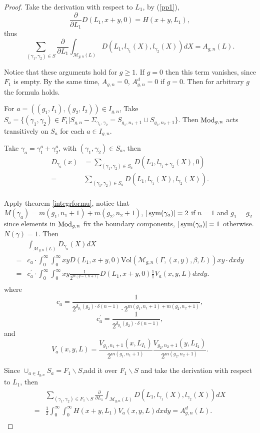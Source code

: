 \begin{proof}
Take the derivation with respect to $L_1$, by (\ref{pp1}),
$$
\frac{\partial }{\partial L_1}D(L_1,x+y,0)=H(x+y,L_1),
$$
thus \begin{equation}\label{partialL2}
   \sum_{(\gamma_1,\gamma_2)\in S} \frac{\partial }{\partial L_1}\int_{\mathscr{M}_{g,n}(L)}D(L_1,l_{\gamma_1}(X),l_{\gamma_2}(X))dX=A_{g,n}(L).
\end{equation}

Notice that these arguments hold for $g\geq 1$. If $g=0$ then this term vanishes, since $F_{1}$ is empty. By the same time, $A_{g,n}=0$, $A_{g,n}^{d}=0$ if $g=0$. Then for arbitrary $g$ the formula holds.


For $a=((g_1,I_1),(g_2,I_2))\in I_{g,n}$, Take $S_a=\{(\gamma_1,\gamma_2)\in F_1|S_{g,n}-\Sigma_{\gamma_1,\gamma_2}=S_{g_1,n_1+1}\cup S_{g_2,n_2+1}\}$. Then $\operatorname{Mod}_{g,n}$ acts transitively on $S_a$ for each $a\in I_{g,n}$.

Take $\gamma_a=\gamma_1^a+\gamma_2^a$, with $(\gamma_1,\gamma_2)\in S_a$, then 
$$\begin{aligned}
D_{\gamma_a}(x)&=\sum_{(\gamma_1,\gamma_2)\in S_a}D(L_1,l_{\gamma_1+\gamma_2}(X),0)\\
=&\sum_{(\gamma_1,\gamma_2)\in S_a}D(L_1,l_{\gamma_1}(X),l_{\gamma_2}(X)).\\
\end{aligned}$$

 Apply theorem \ref{integrformu}, notice that $M(\gamma_a)=m(g_1,n_1+1)+m(g_2,n_2+1)$, $|\operatorname{sym}(\gamma_a)|= 2$ if $n=1$ and $g_1=g_2$ since elements in $\operatorname{Mod}_{g,n}$ fix the boundary components, $|\operatorname{sym}(\gamma_a)|=1$ otherwise.  
 $N(\gamma)=1$. Then 
$$
\begin{aligned}
&\int_{\mathscr{M}_{g,n}(L)}D_{\gamma_a}(X)dX\\
=&c_a\cdot \int_0^\infty \int_0^\infty  xyD(L_1,x+y,0)  \mathrm{Vol}(\mathscr{M}_{g,n}(\Gamma,(x,y),\beta,L))xy\cdot dxdy\\
=&c_a^\prime\cdot\int_0^\infty\int_0^\infty xy  \frac{1}{2^{m(g-1,n+1)}}D(L_1,x+y,0)\frac{1}{1}
V_a(x,y,L)
dxdy.\\
\end{aligned}
$$
where $$c_a=\frac{1}{2^{\delta_{g_1}(g_2)\cdot \delta(n-1)}\cdot 2^{m(g_1,n_1+1)+m(g_2,n_2+1)}},$$ $$c_a^\prime=\frac{1}{2^{\delta_{g_1}(g_2)\cdot \delta(n-1)}},$$ and $$V_a(x,y,L)=\frac{V_{g_1,n_1+1}(x,L_{I_1})}{2^{m(g_1,n_1+1)}}\frac{V_{g_2,n_2+1}(y,L_{I_2})}{2^{m(g_2,n_2+1)}}.$$

Since $\cup_{a\in I_{g,n}}S_a=F_1\backslash S$,add it  over $F_1\backslash S$ and take the derivation with respect to $L_1$, then 
\begin{equation}\label{partialL3}
\begin{aligned}
   &\sum_{(\gamma_1,\gamma_2)\in F_1\backslash S} \frac{\partial }{\partial L_1}\int_{\mathscr{M}_{g,n}(L)}D(L_1,l_{\gamma_1}(X),l_{\gamma_2}(X))dX \\
   =&\frac{1}{2}\int_0^\infty \int_0^\infty H(x+y,L_1)V_a(x,y,L)dxdy =A_{g,n}^{d}(L).\\
   \end{aligned}
\end{equation}



\end{proof}
